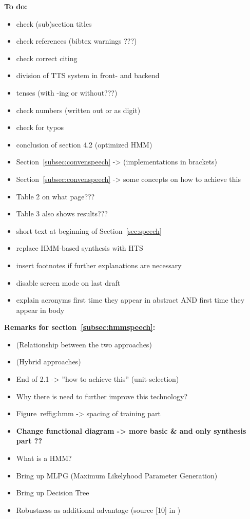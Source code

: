 \vspace{2em}
\textbf{\large To do:}
\vspace{1em}
\begin{itemize}[leftmargin=10pt]
	\item check (sub)section titles
	\item check references (bibtex warnings ???)
	\item check correct citing
	\item division of TTS system in front- and backend
	\item tenses (with -ing or without???)
	\item check numbers (written out or as digit)
	\item check for typos
	\item conclusion of section 4.2 (optimized HMM)
	\item Section~\ref{subsec:convenspeech} -> (implementations in brackets)
	\item Section~\ref{subsec:convenspeech} -> some concepts on how to achieve this
	\item Table 2 on what page???
	\item Table 3 also shows results???
	\item short text at beginning of Section~\ref{sec:speech}
	\item replace HMM-based synthesis with HTS
	\item insert footnotes if further explanations are necessary
	\item disable screen mode on last draft
	\item explain acronyms first time they appear in abstract AND first time they appear in body
\end{itemize}

\vspace{2em}
\textbf{\large Remarks for section~\ref{subsec:hmmspeech}:}
\vspace{1em}
\begin{itemize}[leftmargin=10pt]
	\item (Relationship between the two approaches)
	\item (Hybrid approaches)
	\item End of 2.1 -> ''how to achieve this'' (unit-selection)
	\item Why there is need to further improve this technology?
	\item Figure~ref{fig:hmm} -> spacing of training part
	\item \textbf{Change functional diagram -> more basic \& and only synthesis part ??}
	\item What is a HMM?
	\item Bring up MLPG (Maximum Likelyhood Parameter Generation)
	\item Bring up Decision Tree
	\item Robustness as additional advantage (source [10] in \cite{zen:deepstatistical})
\end{itemize}

